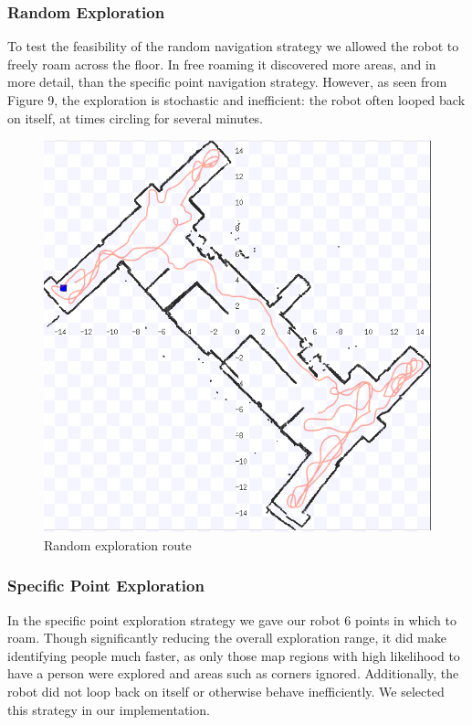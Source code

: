 \documentclass{article}
\begin{document}
      \subsubsection{Random Exploration}
   To test the feasibility of the random navigation strategy we allowed the robot to freely roam across the floor. In free roaming it discovered more areas, and in more detail, than the specific point navigation strategy. However, as seen from Figure 9, the exploration is stochastic and inefficient: the robot often looped back on itself, at times circling for several minutes.
  \begin{figure}[H]
	\begin{center}
              \includegraphics[width=0.8\linewidth]{ExperimentalResults9}
	\end{center}
              \caption{Random exploration route}
          \end{figure}
          
      \subsubsection{Specific Point Exploration}
   In the specific point exploration strategy we gave our robot 6 points in which to roam. Though significantly reducing the overall exploration range, it did make identifying people much faster, as only those map regions with high likelihood to have a person were explored and areas such as corners ignored. Additionally, the robot did not loop back on itself or otherwise behave inefficiently. We selected this strategy in our implementation.
\end{document}
